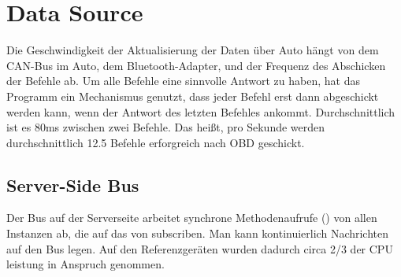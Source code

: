 \documentclass[qualitaetssicherung.tex]{subfiles}
\begin{document}
\section{Data Source}
Die Geschwindigkeit der Aktualisierung der Daten über Auto hängt von dem CAN-Bus
im Auto, dem Bluetooth-Adapter, und der Frequenz des Abschicken der Befehle ab.
Um alle Befehle eine sinnvolle Antwort zu haben, hat das Programm ein
Mechanismus genutzt, dass jeder Befehl erst dann abgeschickt werden kann, wenn der
Antwort des letzten Befehles ankommt. Durchschnittlich ist es 80ms zwischen zwei
Befehle. Das heißt, pro Sekunde werden durchschnittlich 12.5 Befehle erforgreich
nach OBD geschickt.

\subsection{Server-Side Bus}
	Der Bus auf der Serverseite arbeitet synchrone Methodenaufrufe () von allen  Instanzen ab, die auf das  von  subscriben. Man kann kontinuierlich Nachrichten auf den Bus legen. Auf den Referenzgeräten wurden dadurch circa 2/3 der CPU leistung in Anspruch genommen.
\end{document}
